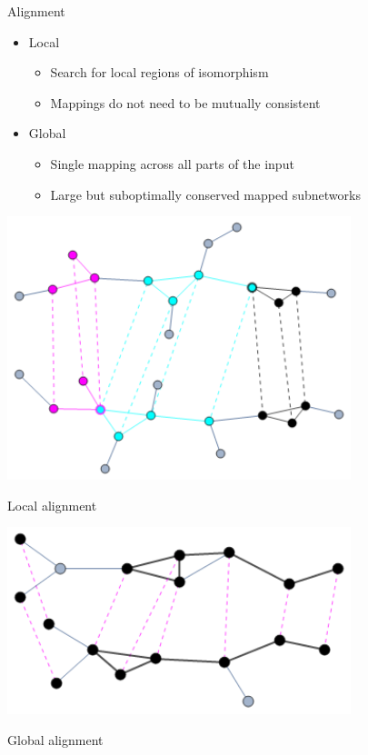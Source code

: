 \documentclass[xcolor=dvipsnames, 14pt]{beamer}
\begin{document}
\begin{frame}{Alignment}
\begin{itemize}
\item Local
\begin{itemize}
\item Search for local regions of isomorphism
\item Mappings do not need to be mutually consistent
\end{itemize}
\item Global
\begin{itemize}
\item Single mapping across all parts of the input
\item Large but suboptimally conserved mapped subnetworks
\end{itemize}
\end{itemize}

\begin{minipage}{0.49\linewidth}
\centering
\includegraphics[width=0.75\textwidth]{local_alignment.png}

\footnotesize Local alignment
\end{minipage}\hfill
\begin{minipage}{0.49\linewidth}
\centering
\includegraphics[width=0.75\textwidth]{global_alignment.png}

\footnotesize Global alignment
\end{minipage}
\end{frame}
\end{document}

